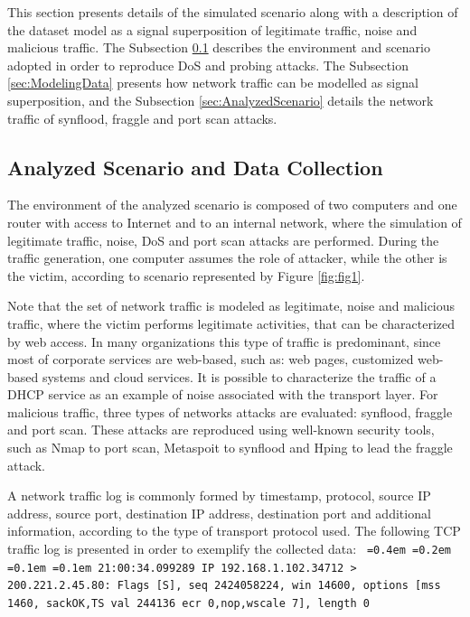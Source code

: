 \documentclass{bmcart}
\newcommand*\justify{%
	\fontdimen2\font=0.4em%
	\fontdimen3\font=0.2em%
	\fontdimen4\font=0.1em%
	\fontdimen7\font=0.1em%
}
\begin{document}
This section presents details of the simulated scenario along with a description of the dataset model as a signal superposition of legitimate traffic, noise and malicious traffic. The Subsection \ref{sec:DataCollection} describes the environment and scenario adopted in order to reproduce DoS and probing attacks. The Subsection \ref{sec:ModelingData} presents how network traffic can be modelled as signal superposition, and the Subsection \ref{sec:AnalyzedScenario} details the network traffic of synflood, fraggle and port scan attacks.

\subsection{Analyzed Scenario and Data Collection}
\label{sec:DataCollection}

The environment of the analyzed scenario is composed of two computers and one router with access to Internet and to an internal network, where the simulation of legitimate traffic, noise, DoS and port scan attacks are performed. During the traffic generation, one computer assumes the role of attacker, while the other is the victim, according to scenario represented by Figure \ref{fig:fig1}.


Note that the set of network traffic is modeled as legitimate, noise and malicious traffic, where the victim performs legitimate activities, that can be characterized by web access. In many organizations this type of traffic is predominant, since most of corporate services are web-based, such as: web pages, customized web-based systems and cloud services. It is possible to characterize the traffic of a DHCP service as an example of noise associated with the transport layer. For malicious traffic, three types of networks attacks are evaluated: synflood, fraggle and port scan. These attacks are reproduced using well-known security tools, such as Nmap to port scan, Metaspoit to synflood and Hping to lead the fraggle attack.

A network traffic log is commonly formed by timestamp, protocol, source IP address, source port, destination IP address, destination port and additional information, according to the type of transport protocol used. The following TCP traffic log is presented in order to exemplify the collected data:
\newline
\newline
\texttt{\justify21:00:34.099289 IP 192.168.1.102.34712 > 200.221.2.45.80: Flags [S], seq 2424058224, win 14600, options [mss 1460, sackOK,TS val 244136 ecr 0,nop,wscale 7], length 0}
\newline
\end{document}
